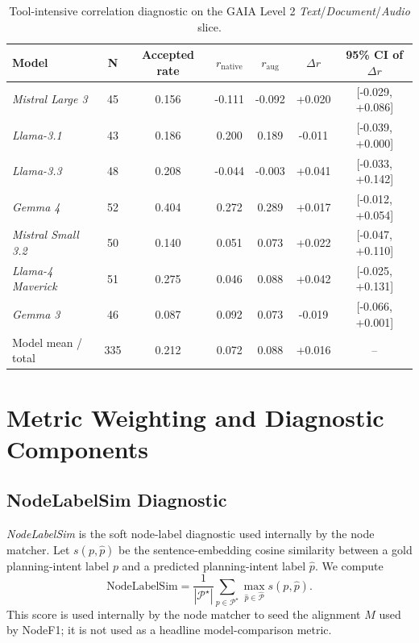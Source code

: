 \documentclass{article}
\providecommand{\model}[1]{\emph{#1}}
\begin{document}
\begin{table}[H]
\centering
\scriptsize
\setlength{\tabcolsep}{7pt}
\begin{tabular}{lcccccc}
\toprule
Model & N & Accepted rate & $r_{\mathrm{native}}$ & $r_{\mathrm{aug}}$ & $\Delta r$ & 95\% CI of $\Delta r$ \\
\midrule
\model{Mistral Large 3} & 45 & 0.156 & -0.111 & -0.092 & +0.020 & [-0.029, +0.086] \\
\model{Llama-3.1} & 43 & 0.186 & 0.200 & 0.189 & -0.011 & [-0.039, +0.000] \\
\model{Llama-3.3} & 48 & 0.208 & -0.044 & -0.003 & +0.041 & [-0.033, +0.142] \\
\model{Gemma 4} & 52 & 0.404 & 0.272 & 0.289 & +0.017 & [-0.012, +0.054] \\
\model{Mistral Small 3.2} & 50 & 0.140 & 0.051 & 0.073 & +0.022 & [-0.047, +0.110] \\
\model{Llama-4 Maverick} & 51 & 0.275 & 0.046 & 0.088 & +0.042 & [-0.025, +0.131] \\
\model{Gemma 3} & 46 & 0.087 & 0.092 & 0.073 & -0.019 & [-0.066, +0.001] \\
\midrule
Model mean / total & 335 & 0.212 & 0.072 & 0.088 & +0.016 & -- \\
\bottomrule
\end{tabular}
\vspace{0.05cm}
\caption{Tool-intensive correlation diagnostic on the GAIA Level 2 \emph{Text}/\emph{Document}/\emph{Audio} slice.}
\label{tab:appendix-current-tool-intensive}
\end{table}

\FloatBarrier

\section{Metric Weighting and Diagnostic Components}
\label{sec:appendix-metric-weighting}

\subsection{NodeLabelSim Diagnostic}
\label{sec:appendix-nodelabelsim}

\emph{NodeLabelSim} is the soft node-label diagnostic used internally by the node matcher. Let $s(p,\hat p)$ be the sentence-embedding cosine similarity between a gold planning-intent label $p$ and a predicted planning-intent label $\hat p$. We compute
\[
\mathrm{NodeLabelSim}
=\frac{1}{|\mathcal{P}^\star|}
\sum_{p\in \mathcal{P}^\star}\max_{\hat p\in\widehat{\mathcal{P}}} s(p,\hat p).
\]
This score is used internally by the node matcher to seed the alignment $M$ used by NodeF1; it is not used as a headline model-comparison metric.
\end{document}
